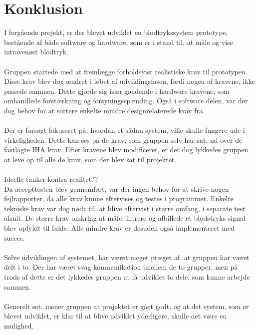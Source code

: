 \chapter{Konklusion}
I forgående projekt, er der blevet udviklet en blodtrykssystem prototype, bestående af både software og hardware, som er i stand til, at måle og vise intravenøst blodtryk. \\
\\
Gruppen startede med at fremlægge forholdsvist realistiske krav til prototypen. Disse krav blev dog ændret i løbet af udviklingsfasen, fordi nogen af kravene, ikke passede sammen. Dette gjorde sig især gældende i hardware kravene, som omhandlede forstærkning og forsyningsspænding. Også i software delen, var der dog behov for at sortere enkelte mindre designrelaterede krav fra.  \\
\\
Der er forsøgt fokuseret på, hvordan et sådan system, ville skulle fungere ude i virkeligheden. Dette kan ses på de krav, som gruppen selv har sat, ud over de fastlagte IHA krav. Efter kravene blev modificeret, er det dog lykkedes gruppen at leve op til alle de krav, som der blev sat til projektet. \\

\\Ideelle tanker kontra realitet??
\\
Da accepttesten blev gennemført, var der ingen behov for at skrive nogen fejlrapporter, da alle krav kunne eftervises og testes i programmet. Enkelte tekniske krav var dog nødt til, at blive eftervist i større omfang, i separate test afsnit. De større krav omkring at måle, filtrere og afbillede et blodstryks signal blev opfyldt til fulde. Alle mindre krav er desuden også implementeret med succes. \\
\\
Selve udviklingen af systemet, har været meget præget af, at gruppen har været delt i to. Der har været svag kommunikation imellem de to grupper, men på trods af dette er det lykkedes gruppen at få udviklet to dele, som kunne arbejde sammen. \\
\\
Generelt set, mener gruppen at projektet er gået godt, og at det system, som er blevet udviklet, er klar til at blive udviklet yderligere, skulle det være en mulighed. \\
\\
